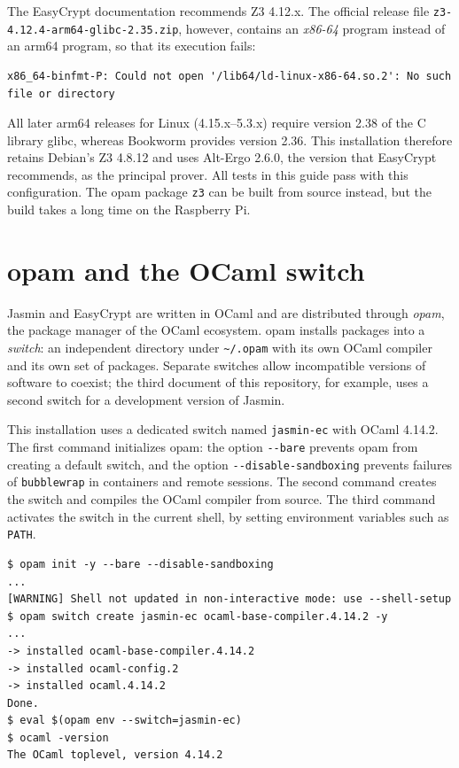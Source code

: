 \documentclass[11pt,a4paper]{article}
\newcommand{\cmd}[1]{\lstinline[style=shell,frame=none]{#1}}
\newcommand{\file}[1]{\texttt{#1}}
\begin{document}
\begin{warning}
The EasyCrypt documentation recommends Z3 4.12.x. The official release file
\texttt{z3-4.12.4-arm64-glibc-2.35.zip}, however, contains an \emph{x86-64}
program instead of an arm64 program, so that its execution fails:
\begin{lstlisting}[style=output]
x86_64-binfmt-P: Could not open '/lib64/ld-linux-x86-64.so.2': No such file or directory
\end{lstlisting}
All later arm64 releases for Linux (4.15.x--5.3.x) require version 2.38 of
the C library glibc, whereas Bookworm provides version 2.36. This
installation therefore retains Debian's Z3 4.8.12 and uses Alt-Ergo 2.6.0,
the version that EasyCrypt recommends, as the principal prover. All tests in
this guide pass with this configuration. The opam package \texttt{z3} can be
built from source instead, but the build takes a long time on the
Raspberry Pi.
\end{warning}

\section{opam and the OCaml switch}
\label{sec:opam}

Jasmin and EasyCrypt are written in OCaml and are distributed through
\emph{opam}, the package manager of the OCaml ecosystem. opam installs
packages into a \emph{switch}: an independent directory under
\file{\textasciitilde/.opam} with its own OCaml compiler and its own set of
packages. Separate switches allow incompatible versions of software to
coexist; the third document of this repository, for example, uses a second
switch for a development version of Jasmin.

This installation uses a dedicated switch named \texttt{jasmin-ec} with
OCaml 4.14.2. The first command initializes opam: the option \cmd{--bare}
prevents opam from creating a default switch, and the option
\cmd{--disable-sandboxing} prevents failures of \texttt{bubblewrap} in
containers and remote sessions. The second command creates the switch and
compiles the OCaml compiler from source. The third command activates the
switch in the current shell, by setting environment variables such as
\texttt{PATH}.

\begin{lstlisting}[style=shell]
$ opam init -y --bare --disable-sandboxing
...
[WARNING] Shell not updated in non-interactive mode: use --shell-setup
$ opam switch create jasmin-ec ocaml-base-compiler.4.14.2 -y
...
-> installed ocaml-base-compiler.4.14.2
-> installed ocaml-config.2
-> installed ocaml.4.14.2
Done.
$ eval $(opam env --switch=jasmin-ec)
$ ocaml -version
The OCaml toplevel, version 4.14.2
\end{lstlisting}
\end{document}
